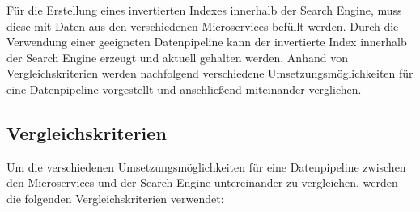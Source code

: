 Für die Erstellung eines invertierten Indexes innerhalb der Search Engine, muss diese mit Daten aus den verschiedenen Microservices befüllt werden. Durch die Verwendung einer geeigneten Datenpipeline kann der invertierte Index innerhalb der Search Engine erzeugt und aktuell gehalten werden. Anhand von Vergleichskriterien werden nachfolgend verschiedene Umsetzungsmöglichkeiten für eine Datenpipeline vorgestellt und anschließend miteinander verglichen.

\subsection{Vergleichskriterien\label{subsec4.1.1:Unterunterpunkt-1}}

Um die verschiedenen Umsetzungsmöglichkeiten für eine Datenpipeline zwischen den Microservices und der Search Engine untereinander zu vergleichen, werden die folgenden Vergleichskriterien verwendet:

